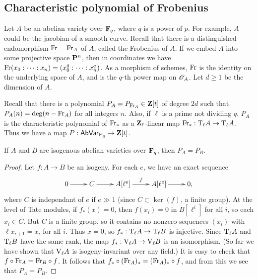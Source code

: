 \subsection{Characteristic polynomial of Frobenius}\label{sec:char-frob}\label{sec:ab-fin-fld}

Let $A$ be an abelian variety over $\mathbf{F}_q$, where $q$ is a power of $p$. For 
example, $A$ could be the jacobian of a smooth curve. Recall that there is a 
distinguished endomorphism $\mathrm{Fr}=\mathrm{Fr}_A$ of $A$, called the Frobenius of $A$. 
If we embed $A$ into some projective space $\mathbf{P}^n$, then in coordinates we 
have $\mathrm{Fr}(x_0:\cdots:x_n) = (x_0^q:\cdots:x_n^q)$. As a morphism of schemes, 
$\mathrm{Fr}$ is the identity on the underlying space of $A$, and is the $q$-th power 
map on $\mathscr{O}_A$. Let $d\geqslant 1$ be the dimension of $A$. 

Recall that there is a polynomial $P_A=P_{\mathrm{Fr}_A}\in \mathbf{Z}[t]$ of degree $2 d$ 
such that $P_A(n)=\deg(n-\mathrm{Fr}_A)$ for all integers $n$. Also, if $\ell$ is a 
prime not dividing $q$, $P_A$ is the characteristic polynomial of $\mathrm{Fr}_\ast$ 
as a $\mathbf{Z}_\ell$-linear map $\mathrm{Fr}_\ast:\mathrm{T}_\ell A\to \mathrm{T}_\ell A$. Thus we have a 
map $P:\mathsf{AbVar}_{\mathbf{F}_q} \to \mathbf{Z}[t]$. 

\begin{theorem}
If $A$ and $B$ are isogenous abelian varieties over $\mathbf{F}_q$, then 
$P_A=P_B$.
\end{theorem}
\begin{proof}
Let $f:A\to B$ be an isogeny. For each $e$, we have an exact sequence 
\[\xymatrix{
  0 \ar[r] 
    & C \ar[r] 
    & A[\ell^e] \ar[r]^-f 
    & A[\ell^e] \ar[r]
    & 0\text{,}
}\]
where $C$ is independant of $e$ if $e\gg 1$ (since $C\subset \ker(f)$, a finite 
group). At the level of Tate modules, if $f_\ast(x)=0$, then 
$f(x_i)=0$ in $B[\ell^i]$ for all $i$, so each $x_i\in C$. But $C$ is a finite 
group, so it contains no nonzero sequences $(x_i)$ with $\ell x_{i+1}=x_i$ for 
all $i$. Thus $x=0$, so $f_\ast:\mathrm{T}_\ell A\to \mathrm{T}_\ell B$ is injective. Since 
$\mathrm{T}_\ell A$ and $\mathrm{T}_\ell B$ have the same rank, the map 
$f_\ast:\mathrm{V}_\ell A\to \mathrm{V}_\ell B$ is an isomorphism. (So far we have shown that 
$\mathrm{V}_\ell A$ is isogeny-invariant over any field.) It is easy to check that 
$f\circ \mathrm{Fr}_A=\mathrm{Fr}_B\circ f$. It follows that 
$f_\ast\circ (\mathrm{Fr}_A)_\ast = (\mathrm{Fr}_A)_\ast \circ f$, and from this we see that 
$P_A=P_B$. 
\end{proof}

